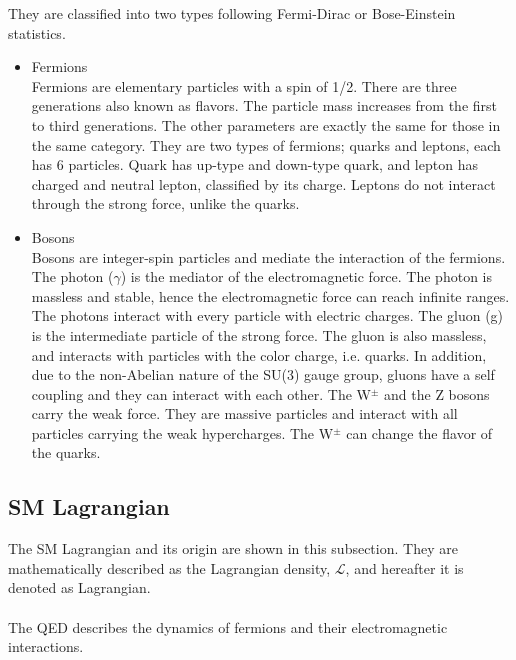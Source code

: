 They are classified into two types following Fermi-Dirac or Bose-Einstein statistics.
\begin{itemize}
    \item Fermions \\
    Fermions are elementary particles with a spin of 1/2. There are three generations also known as flavors.  
    The particle mass increases from the first to third generations. 
    The other parameters are exactly the same for those in the same category. They are two types of fermions; quarks and leptons, each has 6 particles. 
    Quark has up-type and down-type quark, and lepton has charged and neutral lepton, classified by its charge. Leptons do not interact through the strong force, unlike the quarks.
    \item Bosons \\
    Bosons are integer-spin particles and mediate the interaction of the fermions.
    The photon ($\gamma$) is the mediator of the electromagnetic force. The photon is massless and stable, hence the electromagnetic force can reach infinite ranges. 
    The photons interact with every particle with electric charges.
    The gluon (g) is the intermediate particle of the strong force. The gluon is also massless, and interacts with particles with the color charge, i.e. quarks.
    In addition, due to the non-Abelian nature of the SU(3) gauge group, gluons have a self coupling and they can interact with each other.
    The W$^\pm$ and the Z bosons carry the weak force. They are massive particles and interact with all particles carrying the weak hypercharges. 
    The W$^\pm$ can change the flavor of the quarks. 
\end{itemize}

\subsection{SM Lagrangian}
\label{subsec:Lagrangian}
The SM Lagrangian and its origin are shown in this subsection. 
They are mathematically described as the Lagrangian density, $\mathcal{L}$, and hereafter it is denoted as Lagrangian.\\

\noindent\textbf{} \\ 
The QED describes the dynamics of fermions and their electromagnetic interactions.

